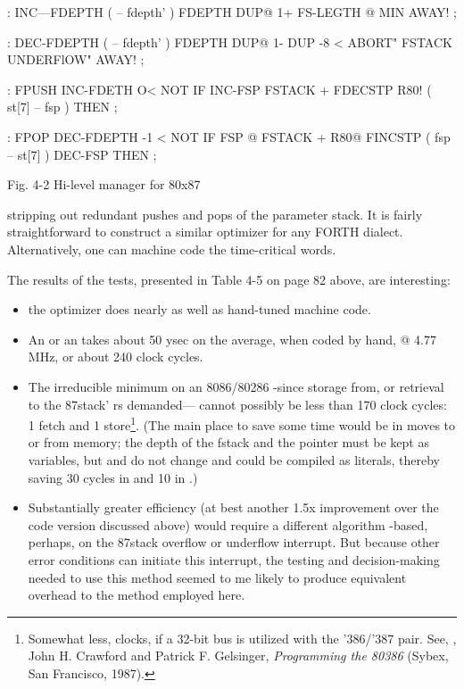 {{{{{\begin{listing}
: INC—FDEPTH                    ( -- fdepth' )
      FDEPTH DUP@ 1+ FS-LEGTH @ MIN
      AWAY! ;

: DEC-FDEPTH                    ( -- fdepth' )
      FDEPTH DUP@ 1- DUP -8 <
      ABORT" FSTACK UNDERFlOW" AWAY! ;

: FPUSH INC-FDETH O< NOT
      IF INC-FSP FSTACK +
          FDECSTP R80!          ( st[7] -- fsp )
      THEN ;

: FPOP DEC-FDEPTH -1 < NOT
       IF FSP @ FSTACK +
       R80@ FINCSTP             ( fsp -- st[7] )
       DEC-FSP THEN ;
\end{listing}
Fig. 4-2 Hi-level manager for 80x87

stripping out redundant pushes and pops of the parameter stack. It is fairly straightforward to construct a similar optimizer for any FORTH dialect. Alternatively, one can machine code the time-critical words.

The results of the tests, presented in Table 4-5 on page 82 above,
are interesting:
\begin{itemize}
    \item the optimizer does nearly as well as hand-tuned machine code.
    \item An  or an  takes about 50 ysec on the average, when coded by hand, @ 4.77 MHz, or about 240 clock cycles.
    \item The irreducible minimum on an 8086/80286 -since  storage from, or retrieval to the 87stack' rs demanded— cannot possibly be less than 170 clock cycles: 1 fetch and 1 store\footnote{Somewhat less,  clocks, if a 32-bit bus is utilized with the '386/'387 pair. See, \eg, John H. Crawford and Patrick F. Gelsinger, \textit{Programming the 80386} (Sybex, San Francisco, 1987).}. (The main place to save some time would be in moves to or from memory; the depth of the fstack and the pointer must be kept as variables, but  and  do not change and could be compiled as literals, thereby saving 30 cycles in  and 10 in .)
    \item Substantially greater efficiency (at best another 1.5x improvement over the code version discussed above) would require a different algorithm -based, perhaps, on the 87stack overflow or underflow interrupt. But because other error conditions can initiate this interrupt, the testing and decision-making needed to use this method seemed to me likely to produce equivalent overhead to the method employed here.


\end{itemize}}}}}}
